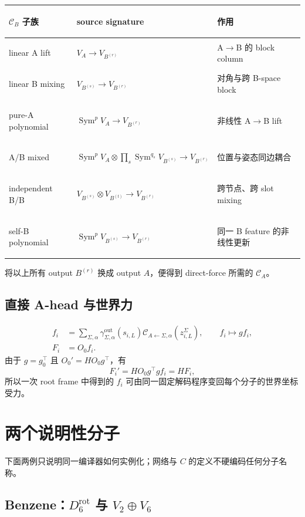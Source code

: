 \documentclass[11pt,a4paper,fontset=fandol]{ctexart}
\newcommand{\Sym}{\operatorname{Sym}}
\newcommand{\cA}{\mathcal C_A}
\newcommand{\cB}{\mathcal C_B}
\begin{document}
\begin{center}
\small
\begin{tabularx}{\linewidth}{>{\bfseries\raggedright\arraybackslash}p{.22\linewidth} >{\raggedright\arraybackslash}p{.34\linewidth} X}
\toprule
$\cB$ 子族 & source signature & 作用 \\
\midrule
linear A lift & $V_A\to V_{B^{(r)}}$ & A$\to$B 的 block column\\
linear B mixing & $V_{B^{(s)}}\to V_{B^{(r)}}$ & 对角与跨 B-space block\\
pure-A polynomial & $\Sym^pV_A\to V_{B^{(r)}}$ & 非线性 A$\to$B lift\\
A/B mixed & $\Sym^pV_A\otimes\prod_s\Sym^{q_s}V_{B^{(s)}}\to V_{B^{(r)}}$ & 位置与姿态同边耦合\\
independent B/B & $V_{B^{(s)}}\otimes V_{B^{(t)}}\to V_{B^{(r)}}$ & 跨节点、跨 slot mixing\\
self-B polynomial & $\Sym^pV_{B^{(s)}}\to V_{B^{(r)}}$ & 同一 B feature 的非线性更新\\
\bottomrule
\end{tabularx}
\end{center}
将以上所有 output $B^{(r)}$ 换成 output $A$，便得到 direct-force 所需的 $\cA$。

\subsection{直接 A-head 与世界力}

\begin{align}
  f_i
  &=\sum_{\Sigma,\alpha}
  \gamma_{\Sigma,\alpha}^{\mathrm{out}}(s_{i,L})
  \mathcal C_{A\leftarrow\Sigma,\alpha}(z_{i,L}^{\Sigma}),
  \qquad f_i\mapsto gf_i,
  \label{eq:a-head}\\
  F_i&=O_0f_i.
  \label{eq:world-force}
\end{align}
由于 $g=g_0^\top$ 且 $O_0' = HO_0g^\top$，有
\begin{equation}
  F_i'=HO_0g^\top gf_i=HF_i,
\end{equation}
所以一次 root frame 中得到的 $f_i$ 可由同一固定解码程序变回每个分子的世界坐标受力。

\section{两个说明性分子}

下面两例只说明同一编译器如何实例化；网络与 $C$ 的定义不硬编码任何分子名称。

\subsection{Benzene：$D_6^{\mathrm{rot}}$ 与 $V_2\oplus V_6$}
\end{document}

